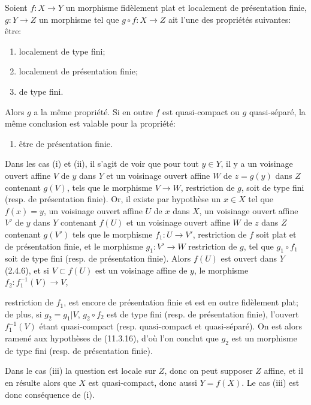 \begin{lemma}[17.7.5]
\label{IV.17.7.5}
Soient $f:X\to Y$ un morphisme fidèlement plat et localement de présentation finie, $g:Y\to Z$ un morphisme tel que $g\circ f:X\to Z$ ait l'une des propriétés suivantes: être:
\begin{enumerate}
  \item[(i)] localement de type fini;
  \item[(ii)] localement de présentation finie;
  \item[(iii)] de type fini.
\end{enumerate}
Alors $g$ a la même propriété. Si en outre $f$ est quasi-compact ou $g$ quasi-séparé, la même conclusion est valable pour la propriété:
\begin{enumerate}
  \item[(iv)] être de présentation finie.
\end{enumerate}
\end{lemma}

Dans les cas (i) et (ii), il s'agit de voir que pour tout $y\in Y$, il y a un voisinage ouvert affine $V$ de $y$ dans $Y$ et un voisinage ouvert affine $W$ de $z=g(y)$ dans $Z$ contenant $g(V)$, tels que le morphisme $V\to W$, restriction de $g$, soit de type fini (resp. de présentation finie). Or, il existe par hypothèse un $x\in X$ tel que $f(x)=y$, un voisinage ouvert affine $U$ de $x$ dans $X$, un voisinage ouvert affine $V'$ de $y$ dans $Y$ contenant $f(U)$ et un voisinage ouvert affine $W$ de $z$ dans $Z$ contenant $g(V')$ tels que le morphisme $f_1:U\to V'$, restriction de $f$ soit plat et de présentation finie, et le morphisme $g_1:V'\to W$ restriction de $g$, tel que $g_1\circ f_1$ soit de type fini (resp. de présentation finie). Alors $f(U)$ est ouvert dans $Y$ (2.4.6), et si $V\subset f(U)$ est un voisinage affine de $y$, le morphisme $f_2:f_1^{-1}(V)\to V$,


restriction de $f_1$, est encore de présentation finie et est en outre fidèlement plat; de plus, si $g_2=g_1|V$, $g_2\circ f_2$ est de type fini (resp. de présentation finie), l'ouvert $f_1^{-1}(V)$ étant quasi-compact (resp. quasi-compact et quasi-séparé). On est alors ramené aux hypothèses de (11.3.16), d'où l'on conclut que $g_2$ est un morphisme de type fini (resp. de présentation finie).

Dans le cas (iii) la question est locale sur $Z$, donc on peut supposer $Z$ affine, et il en résulte alors que $X$ est quasi-compact, donc aussi $Y=f(X)$. Le cas (iii) est donc conséquence de (i).

